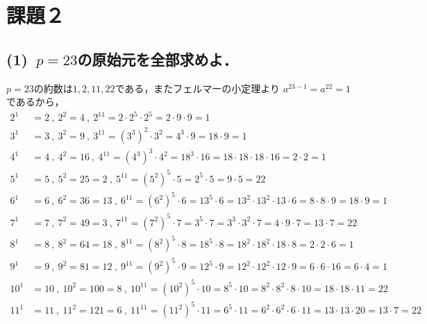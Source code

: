 \documentclass[a4paper,12pt]{jarticle}
\begin{document}
\section*{課題２}
\vspace{-3mm}
\subsection*{(1)~$p=23$の原始元を全部求めよ．}
\vspace{-3mm}
$p=23$の約数は$1,2,11,22$である，またフェルマーの小定理より
$a^{23-1}=a^{22}=1$であるから，
%
\begin{align*}
 2^1&=2~,~2^2=4~,~2^{11}=2\cdot2^5\cdot2^5=2\cdot9\cdot9=1 \nonumber\\
 3^1&=3~,~3^2=9~,~3^{11}=(3^3)^2\cdot3^2=4^3\cdot9=18\cdot9=1 \nonumber\\
 4^1&=4~,~4^2=16~,~4^{11}=(4^3)^3\cdot4^2=18^3\cdot16=18\cdot18\cdot18\cdot16=2\cdot2=1\nonumber\\
 5^1&=5~,~5^2=25=2~,~5^{11}=(5^2)^5\cdot5=2^5\cdot5=9\cdot5=22\nonumber\\
 6^1&=6~,~6^2=36=13~,~6^{11}=(6^2)^5\cdot6=13^5\cdot6=13^2\cdot13^2\cdot13\cdot6=8\cdot8\cdot9=18\cdot9=1\nonumber\\
 7^1&=7~,~7^2=49=3~,~7^{11}=(7^2)^5\cdot7=3^5\cdot7=3^3\cdot3^2\cdot7=4\cdot9\cdot7=13\cdot7=22\nonumber\\
 8^1&=8~,~8^2=64=18~,~8^{11}=(8^2)^5\cdot8=18^5\cdot8=18^2\cdot18^2\cdot18\cdot8=2\cdot2\cdot6=1\nonumber\\
 9^1&=9~,~9^2=81=12~,~9^{11}=(9^2)^5\cdot9=12^5\cdot9=12^2\cdot12^2\cdot12\cdot9=6\cdot6\cdot16=6\cdot4=1\nonumber\\
 10^1&=10~,~10^2=100=8~,~10^{11}=(10^2)^5\cdot10=8^5\cdot10=8^2\cdot8^2\cdot8\cdot10=18\cdot18\cdot11=22\nonumber\\
 11^1&=11~,~11^2=121=6~,~11^{11}=(11^2)^5\cdot11=6^5\cdot11=6^2\cdot6^2\cdot6\cdot11=13\cdot13\cdot20=13\cdot7=22\nonumber
\end{align*}
%
\end{document}
